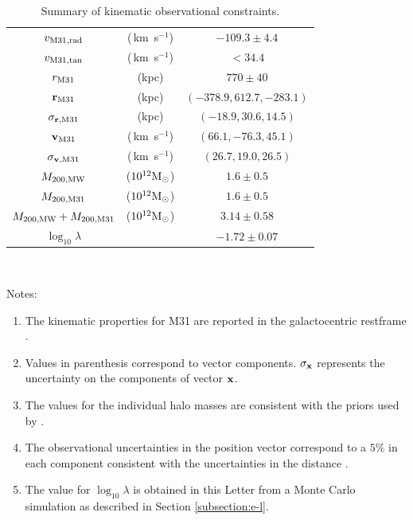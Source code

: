 \documentclass{emulateapj}
\newcommand{\kms}{\,km~s$^{-1}$}
\newcommand{\Msun}{{\ifmmode{{\rm {M_{\odot}}}}\else{${\rm{M_{\odot}}}$}\fi}}
\begin{document}
\begin{table}
\caption{Summary of kinematic observational constraints.}
\begin{center}
\begin{tabular}{ccc}\hline
$v_{\rm M31,rad}$ &(\kms) & $-109.3\pm 4.4$\\
$v_{\rm M31,tan}$ &(\kms) & $<34.4$\\
$r_{\rm M31}$ &(kpc) & $770\pm 40$\\
${\bf r}_{\rm M31}$ & (kpc) &$(-378.9, 612.7, -283.1)$\\
$\sigma_{{\bf r}, {\rm M31}}$ & (kpc) &$(-18.9, 30.6, 14.5)$\\
${\bf v}_{\rm M31}$ & (\kms) & $(66.1, -76.3, 45.1)$\\
$\sigma_{{\bf v},{\rm M31}}$ & (\kms) &$(26.7, 19.0, 26.5)$\\
$M_{\rm 200, MW}$ & ($10^{12}\Msun$) & $1.6\pm0.5$ \\
$M_{\rm 200, M31}$ & ($10^{12}\Msun$) & $1.6\pm0.5$ \\
$M_{\rm 200,MW} + M_{\rm 200, M31}$ & ($10^{12}\Msun$) & $3.14\pm 0.58$\\
$\log_{10}\lambda$& & $-1.72\pm 0.07$ \\\hline
\end{tabular}\\
\end{center}
\vspace{1mm}
Notes:\\
\begin{enumerate}
\item The kinematic
  properties for M31 are reported in the galactocentric restframe 
  \citep{vanderMarel12}. 

\item Values in parenthesis correspond to vector
  components. $\sigma_{\bf x}$ represents the uncertainty on the
  components of vector ${\bf x}$. 
\item The values for the individual halo
masses are consistent with the priors used by \cite{vanderMarel12}.


\item The observational uncertainties in the position vector
correspond to a $5\%$ in each component consistent with the
uncertainties in the distance \citep[see references
  in][]{vanderMarel08}.

\item The value for $\log_{10}\lambda$ is obtained in this Letter
from a Monte Carlo simulation as described in Section
\ref{subsection:e-l}. 
\end{enumerate}
\label{table:1}
\end{table}
\end{document}
